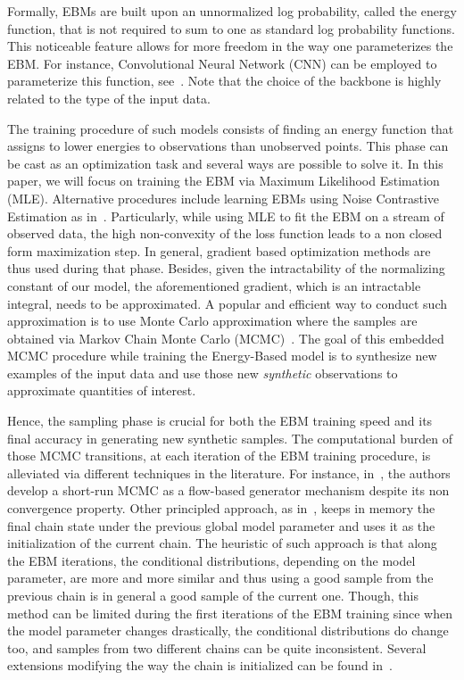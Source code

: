 \documentclass{article} %
\begin{document}
Formally, EBMs are built upon an unnormalized log probability, called the energy function, that is not required to sum to one as standard log probability functions.
This noticeable feature allows for more freedom in the way one parameterizes the EBM.
For instance, Convolutional Neural Network (CNN) can be employed to parameterize this function, see~\citet{xie2016theory}.
Note that the choice of the backbone is highly related to the type of the input data.

The training procedure of such models consists of finding an energy function that assigns to lower energies to observations than unobserved points.
This phase can be cast as an optimization task and several ways are possible to solve it.
In this paper, we will focus on training the EBM via Maximum Likelihood Estimation (MLE).
Alternative procedures include learning EBMs using Noise Contrastive Estimation as in~\citet{gao2020flow}.
Particularly, while using MLE to fit the EBM on a stream of observed data, the high non-convexity of the loss function leads to a non closed form maximization step. 
In general, gradient based optimization methods are thus used during that phase.
Besides, given the intractability of the normalizing constant of our model, the aforementioned gradient, which is an intractable integral, needs to be approximated.
A popular and efficient way to conduct such approximation is to use Monte Carlo approximation where the samples are obtained via Markov Chain Monte Carlo (MCMC)~\cite{meyn2012markov}.
The goal of this embedded MCMC procedure while training the Energy-Based model is to synthesize new examples of the input data and use those new \emph{synthetic} observations to approximate quantities of interest.

Hence, the sampling phase is crucial for both the EBM training speed and its final accuracy in generating new synthetic samples.
The computational burden of those MCMC transitions, at each iteration of the EBM training procedure, is alleviated via different techniques in the literature.
For instance, in~\citet{nijkamp2019learning}, the authors develop a short-run MCMC as a flow-based generator mechanism despite its non convergence property.
Other principled approach, as in~\citet{hinton2002training}, keeps in memory the final chain state under the previous global model parameter and uses it as the initialization of the current chain.
The heuristic of such approach is that along the EBM iterations, the conditional distributions, depending on the model parameter, are more and more similar and thus using a good sample from the previous chain is in general a good sample of the current one.
Though, this method can be limited during the first iterations of the EBM training since when the model parameter changes drastically, the conditional distributions do change too, and samples from two different chains can be quite inconsistent.
Several extensions modifying the way the chain is initialized can be found in~\citet{welling2002new,gao2018learning,du2019implicit}.
\end{document}
